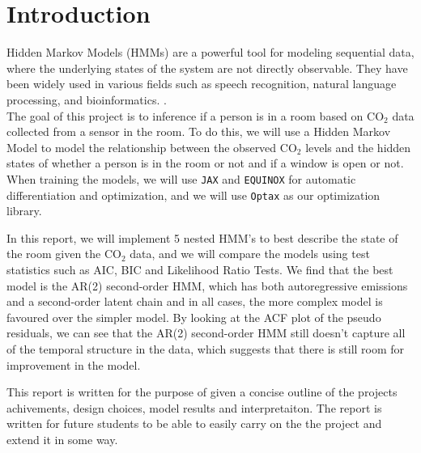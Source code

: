
\section{Introduction}
Hidden Markov Models (HMMs) are a powerful tool for modeling sequential data, where the underlying states of the system are not directly observable. 
They have been widely used in various fields such as speech recognition, natural language processing, and bioinformatics. \citep{ultralytics_hmm_glossary}. \\
The goal of this project is to inference if a person is in a room based on $\text{CO}_2$ data collected from a sensor in the room. 
To do this, we will use a Hidden Markov Model to model the relationship between the observed $\text{CO}_2$ levels and the hidden states of whether a person is in the room or not and if a window is open or not. 
When training the models, we will use \texttt{JAX} \citep{jax2018github}  and \texttt{EQUINOX} \citep{kidger2021equinox} for automatic differentiation and optimization,
and we will use \texttt{Optax} \citep{optax2020github} as our optimization library. \newline


In this report, we will implement 5 nested HMM's to best describe the state of the room 
given the $\text{CO}_2$ data, and we will compare the models using test statistics such as AIC, BIC and Likelihood Ratio Tests. \newline
We find that the best model is the AR(2) second-order HMM, which has both autoregressive emissions and a second-order latent chain and in
all cases, the more complex model is favoured over the simpler model. \newline
By looking at the ACF plot of the pseudo residuals, 
we can see that the AR(2) second-order HMM still doesn't capture all of the 
temporal structure in the data, which suggests that there is still room for improvement in the model. \newline


This report is written for the purpose of given a concise outline of the projects achivements, 
design choices, model results and interpretaiton. The report is written for future students 
to be able to easily carry on the the project and extend it in some way. \newline 

  
